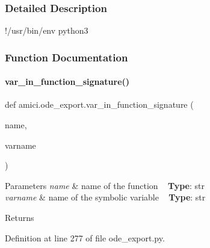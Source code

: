 \subsubsection{Detailed Description}
!/usr/bin/env python3 

\subsubsection{Function Documentation}
\mbox{\label{namespaceamici_1_1ode__export_a365aaf8b78bb2db9c94b1a8087d60a16}} 
\paragraph{\texorpdfstring{var\+\_\+in\+\_\+function\+\_\+signature()}{var\_in\_function\_signature()}}
{\footnotesize\ttfamily def amici.\+ode\+\_\+export.\+var\+\_\+in\+\_\+function\+\_\+signature (\begin{DoxyParamCaption}\item[{}]{name,  }\item[{}]{varname }\end{DoxyParamCaption})}


\begin{DoxyParams}{Parameters}
{\em name} & name of the function ~\newline
{\bfseries Type}\+: str\\
\hline
{\em varname} & name of the symbolic variable ~\newline
{\bfseries Type}\+: str\\
\hline
\end{DoxyParams}
\begin{DoxyReturn}{Returns}

\end{DoxyReturn}


Definition at line 277 of file ode\+\_\+export.\+py.

